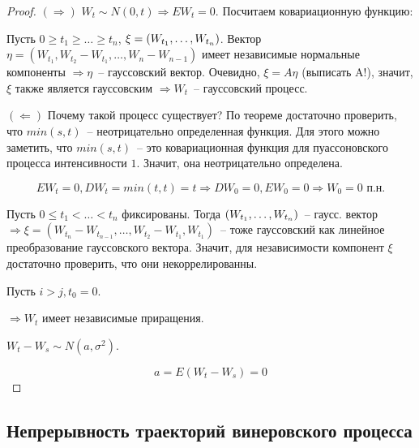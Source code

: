 \begin{proof} \forcenewline
$(\Rightarrow)$ $W_t \sim N(0, t) \Rightarrow EW_t = 0$. Посчитаем ковариационную функцию:


Пусть $0 \geq t_1 \geq \dots \geq t_n$, $\xi = (W_{t_1}, \dots, W_{t_n})$.
Вектор $\eta = (W_{t_1}, W_{t_2} - W_{t_1}, \dots, W_n - W_{n-1})$ имеет независимые нормальные
компоненты $\Rightarrow \eta$~-- гауссовский вектор.  Очевидно, $\xi = A\eta$ (выписать A!), значит,
$\xi$ также является гауссовским $\Rightarrow W_t$~-- гауссовский процесс.

$(\Leftarrow)$ Почему такой процесс существует? По теореме достаточно проверить, что $min(s, t)$~--
неотрицательно определенная функция.
Для этого можно заметить, что $min(s,t)$~-- это ковариационная функция для пуассоновского процесса
интенсивности $1$. Значит, она неотрицательно определена.

$$EW_t = 0, DW_t = min(t, t) = t \Rightarrow DW_0 = 0, EW_0 = 0 \Rightarrow W_0 = 0 \text{ п.н.}$$

Пусть $0 \leq t_1 < \dots < t_n$ фиксированы. Тогда $(W_{t_1}, \dots, W_{t_n})$~-- гаусс. вектор
$\Rightarrow \xi = (W_{t_n} - W_{t_{n-1}}, \dots, W_{t_2} - W_{t_1}, W_{t_1})$~-- тоже гауссовский
как линейное преобразование гауссовского вектора. Значит, для независимости компонент $\xi$
достаточно проверить, что они некоррелированны.

Пусть $i > j, t_0 = 0$.


$\Rightarrow W_t$ имеет независимые приращения.

$W_t - W_s \sim N(a, \sigma^2)$.

$$a = E(W_t-W_s) = 0$$
\end{proof}

\subsection{Непрерывность траекторий винеровского процесса}

